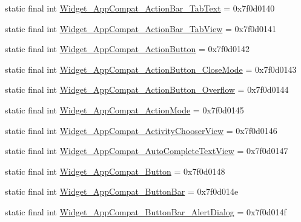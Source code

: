 \begin{DoxyCompactItemize}
\item 
static final int \mbox{\hyperlink{classandroid_1_1support_1_1v7_1_1appcompat_1_1R_1_1style_a577669ac1cf782a721001fe744374741}{Widget\+\_\+\+App\+Compat\+\_\+\+Action\+Bar\+\_\+\+Tab\+Text}} = 0x7f0d0140
\item 
static final int \mbox{\hyperlink{classandroid_1_1support_1_1v7_1_1appcompat_1_1R_1_1style_a22b55f7cb4073c4b1890d22d27af414b}{Widget\+\_\+\+App\+Compat\+\_\+\+Action\+Bar\+\_\+\+Tab\+View}} = 0x7f0d0141
\item 
static final int \mbox{\hyperlink{classandroid_1_1support_1_1v7_1_1appcompat_1_1R_1_1style_a604fa2bfad530b840478f9ca70decb84}{Widget\+\_\+\+App\+Compat\+\_\+\+Action\+Button}} = 0x7f0d0142
\item 
static final int \mbox{\hyperlink{classandroid_1_1support_1_1v7_1_1appcompat_1_1R_1_1style_acffc9b830cdc90b6caf36cbc82f002a2}{Widget\+\_\+\+App\+Compat\+\_\+\+Action\+Button\+\_\+\+Close\+Mode}} = 0x7f0d0143
\item 
static final int \mbox{\hyperlink{classandroid_1_1support_1_1v7_1_1appcompat_1_1R_1_1style_a0b2c92644f2e6ec3ad85613e11f9c80c}{Widget\+\_\+\+App\+Compat\+\_\+\+Action\+Button\+\_\+\+Overflow}} = 0x7f0d0144
\item 
static final int \mbox{\hyperlink{classandroid_1_1support_1_1v7_1_1appcompat_1_1R_1_1style_ab558061ee2c1f9685ea9b614eaa9808a}{Widget\+\_\+\+App\+Compat\+\_\+\+Action\+Mode}} = 0x7f0d0145
\item 
static final int \mbox{\hyperlink{classandroid_1_1support_1_1v7_1_1appcompat_1_1R_1_1style_a798d9542c79456837c27af4af31d41a4}{Widget\+\_\+\+App\+Compat\+\_\+\+Activity\+Chooser\+View}} = 0x7f0d0146
\item 
static final int \mbox{\hyperlink{classandroid_1_1support_1_1v7_1_1appcompat_1_1R_1_1style_ae0db3ec24d96627ddd823d9513596e91}{Widget\+\_\+\+App\+Compat\+\_\+\+Auto\+Complete\+Text\+View}} = 0x7f0d0147
\item 
static final int \mbox{\hyperlink{classandroid_1_1support_1_1v7_1_1appcompat_1_1R_1_1style_a972eb28b6630bea576e5da76a6c71e87}{Widget\+\_\+\+App\+Compat\+\_\+\+Button}} = 0x7f0d0148
\item 
static final int \mbox{\hyperlink{classandroid_1_1support_1_1v7_1_1appcompat_1_1R_1_1style_a35ffe2c992c94dbfdd7b31694e76fa29}{Widget\+\_\+\+App\+Compat\+\_\+\+Button\+Bar}} = 0x7f0d014e
\item 
static final int \mbox{\hyperlink{classandroid_1_1support_1_1v7_1_1appcompat_1_1R_1_1style_ae01cc979ac39252c299ba937499caab5}{Widget\+\_\+\+App\+Compat\+\_\+\+Button\+Bar\+\_\+\+Alert\+Dialog}} = 0x7f0d014f

\end{DoxyCompactItemize}
